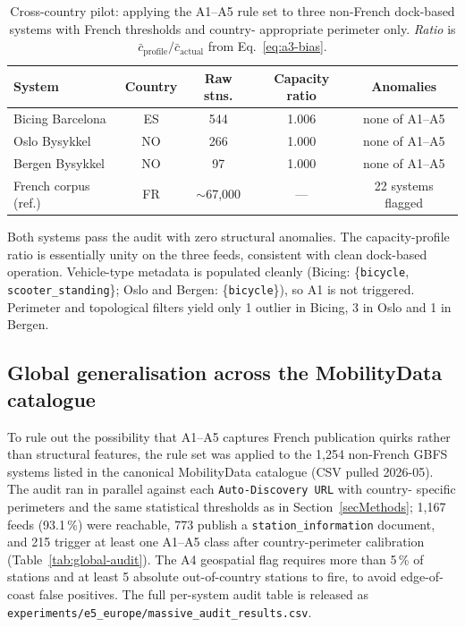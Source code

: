 \documentclass[11pt,a4paper]{article}
\begin{document}
\begin{table}[ht]
\centering
\caption{Cross-country pilot: applying the A1--A5 rule set to three
non-French dock-based systems with French thresholds and country-
appropriate perimeter only. \emph{Ratio} is
$\bar c_{\text{profile}} / \bar c_{\text{actual}}$ from
Eq.~\ref{eq:a3-bias}.}
\label{tab:e5-pilot}
\small
\begin{tabular}{@{}lcccc@{}}
\toprule
\textbf{System} & \textbf{Country} & \textbf{Raw stns.}
                & \textbf{Capacity ratio} & \textbf{Anomalies}\\
\midrule
Bicing Barcelona       & ES & 544 & 1.006 & none of A1--A5 \\
Oslo Bysykkel          & NO & 266 & 1.000 & none of A1--A5 \\
Bergen Bysykkel        & NO &  97 & 1.000 & none of A1--A5 \\
\midrule
French corpus (ref.)   & FR & $\sim$67{,}000 & --- & 22 systems flagged \\
\bottomrule
\end{tabular}
\end{table}

Both systems pass the audit with zero structural anomalies. The
capacity-profile ratio is essentially unity on the three feeds,
consistent with clean dock-based operation. Vehicle-type metadata is
populated cleanly (Bicing: \{\texttt{bicycle}, \texttt{scooter\_standing}\};
Oslo and Bergen: \{\texttt{bicycle}\}), so A1 is not triggered.
Perimeter and topological filters yield only 1 outlier in Bicing, 3
in Oslo and 1 in Bergen.

\subsection{Global generalisation across the MobilityData catalogue}\label{secGlobal}
To rule out the possibility that A1--A5 captures French publication
quirks rather than structural features, the rule set was applied to
the 1{,}254 non-French GBFS systems listed in the canonical
MobilityData catalogue (CSV pulled 2026-05). The audit ran in
parallel against each \texttt{Auto-Discovery URL} with country-
specific perimeters and the same statistical thresholds as in
Section~\ref{secMethods}; 1{,}167 feeds (93.1\,\%) were reachable,
773 publish a \texttt{station\_information} document, and 215
trigger at least one A1--A5 class after country-perimeter
calibration (Table~\ref{tab:global-audit}). The A4 geospatial flag
requires more than 5\,\% of stations and at least 5 absolute
out-of-country stations to fire, to avoid edge-of-coast false
positives. The full per-system audit table is released as
\texttt{experiments/e5\_europe/massive\_audit\_results.csv}.
\end{document}

